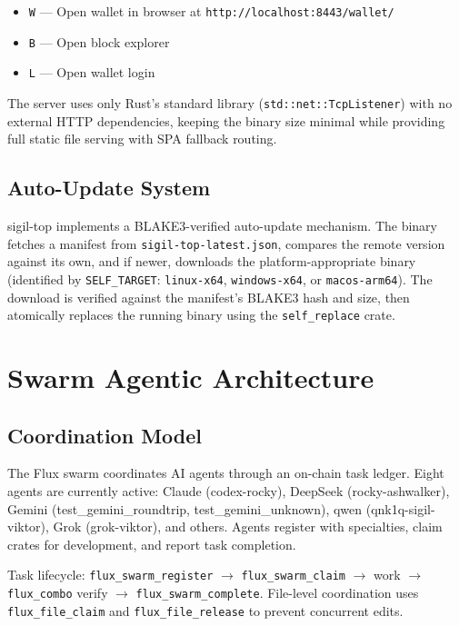 \documentclass[11pt,a4paper]{article}
\begin{document}
\begin{itemize}
\item \texttt{W} — Open wallet in browser at \texttt{http://localhost:8443/wallet/}
\item \texttt{B} — Open block explorer
\item \texttt{L} — Open wallet login
\end{itemize}

The server uses only Rust's standard library (\texttt{std::net::TcpListener}) with no external HTTP dependencies, keeping the binary size minimal while providing full static file serving with SPA fallback routing.

\subsection{Auto-Update System}

sigil-top implements a BLAKE3-verified auto-update mechanism. The binary fetches a manifest from \texttt{sigil-top-latest.json}, compares the remote version against its own, and if newer, downloads the platform-appropriate binary (identified by \texttt{SELF\_TARGET}: \texttt{linux-x64}, \texttt{windows-x64}, or \texttt{macos-arm64}). The download is verified against the manifest's BLAKE3 hash and size, then atomically replaces the running binary using the \texttt{self\_replace} crate.

\section{Swarm Agentic Architecture}

\subsection{Coordination Model}

The Flux swarm coordinates AI agents through an on-chain task ledger. Eight agents are currently active: Claude (codex-rocky), DeepSeek (rocky-ashwalker), Gemini (test\_gemini\_roundtrip, test\_gemini\_unknown), qwen (qnk1q-sigil-viktor), Grok (grok-viktor), and others. Agents register with specialties, claim crates for development, and report task completion.

Task lifecycle: \texttt{flux\_swarm\_register} $\rightarrow$ \texttt{flux\_swarm\_claim} $\rightarrow$ work $\rightarrow$ \texttt{flux\_combo} verify $\rightarrow$ \texttt{flux\_swarm\_complete}. File-level coordination uses \texttt{flux\_file\_claim} and \texttt{flux\_file\_release} to prevent concurrent edits.
\end{document}
